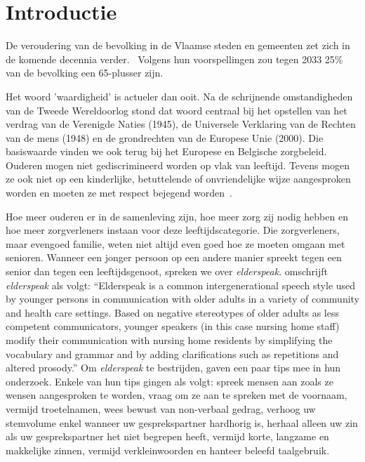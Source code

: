 

\section{Introductie}\label{sec:introductie} %

De veroudering van de bevolking in de Vlaamse steden en gemeenten zet zich in de komende  decennia verder.~\autocite{StatistiekVlaanderen2018}
Volgens hun voorspellingen zou tegen 2033 25\% van de bevolking een 65-plusser zijn.

Het woord 'waardigheid' is actueler dan ooit.
Na de schrijnende omstandigheden van de Tweede Wereldoorlog stond dat woord centraal bij het opstellen van het verdrag van de Verenigde Naties (1945), de Universele Verklaring van de Rechten van de mens (1948) en de grondrechten van de Europese Unie (2000).
Die basiswaarde vinden we ook terug bij het Europese en Belgische zorgbeleid. Ouderen mogen niet gediscrimineerd worden op vlak van leeftijd. Tevens mogen ze ook niet op een kinderlijke, betuttelende of onvriendelijke wijze aangesproken worden en moeten ze met respect bejegend worden~\autocite{Campens}.

Hoe meer ouderen er in de samenleving zijn, hoe meer zorg zij nodig hebben en hoe meer zorgverleners instaan voor deze leeftijdscategorie.
Die zorgverleners, maar evengoed familie, weten niet altijd even goed hoe ze moeten omgaan met senioren.
Wanneer een jonger persoon op een andere manier spreekt tegen een senior dan tegen een leeftijdsgenoot, spreken we over \textit{elderspeak}. \textcite{Williams2011} omschrijft \textit{elderspeak} als volgt: ``Elderspeak is a common intergenerational speech style used by younger persons in communication with older adults in a variety of community and health care settings. Based on negative stereotypes of older adults as less competent communicators, younger speakers (in this case nursing home staff) modify their communication with nursing home residents by simplifying the vocabulary and grammar and by adding clarifications such as repetitions and altered prosody.'' Om \textit{elderspeak} te bestrijden, gaven \textcite{Wick2007} een paar tips mee in hun onderzoek.
Enkele van hun tips gingen als volgt: spreek mensen aan zoals ze wensen aangesproken te worden, vraag om ze aan te spreken met de voornaam, vermijd troetelnamen, wees bewust van non-verbaal gedrag, verhoog uw stemvolume enkel wanneer uw gesprekspartner hardhorig is, herhaal alleen uw zin als uw gesprekspartner het niet begrepen heeft, vermijd korte, langzame en makkelijke zinnen, vermijd verkleinwoorden en hanteer beleefd taalgebruik.

